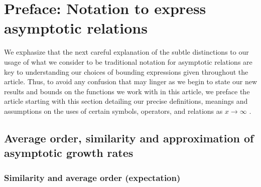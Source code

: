 \documentclass[11pt,reqno,a4letter]{article}
\numberwithin{figure}{section}
\numberwithin{table}{section}
\newcommand{\cf}{\textit{cf.\ }}
\theoremstyle{plain}
\numberwithin{theorem}{section}
\theoremstyle{definition}
\begin{document}

\newpage
\label{Appendix_Glossary_NotationConvs}
     \vskip 0in
     \printglossary[type={symbols},
                    title={Glossary of special notation and conventions},
                    style={glossstyleSymbol},
                    nogroupskip=true]



\newpage
\section{Preface: Notation to express asymptotic relations} 

We exphasize that the next careful explanation of the subtle distinctions to our usage of 
what we consider to be traditional notation for asymptotic relations are key to 
understanding our choices of bounding expressions given throughout the article. 
Thus, to avoid any confusion that may linger as we begin to state our new results and bounds on the 
functions we work with in this article, we preface the article starting with this section detailing 
our precise definitions, meanings and assumptions on the uses of certain symbols, operators, and 
relations as $x \rightarrow \infty$ \cite[\cf \S 2]{NISTHB} \cite{ACOMB-BOOK}. 

\subsection{Average order, similarity and approximation of asymptotic growth rates} 

\subsubsection{Similarity and average order (expectation)} 
\end{document}
